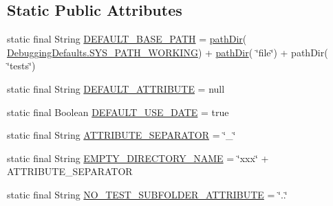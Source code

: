 \subsection*{Static Public Attributes}
\begin{DoxyCompactItemize}
\item 
static final String \hyperlink{classit_1_1emarolab_1_1cagg_1_1interfaces_1_1CaggGrammarTesterOnFile_a2ab3d8af62c461ca52a0d174d6e0ed42}{D\-E\-F\-A\-U\-L\-T\-\_\-\-B\-A\-S\-E\-\_\-\-P\-A\-T\-H} = \hyperlink{classit_1_1emarolab_1_1cagg_1_1interfaces_1_1CaggGrammarTesterOnFile_aa398e2cc3a5a0d558b20109c022fc037}{path\-Dir}( \hyperlink{classit_1_1emarolab_1_1cagg_1_1debugging_1_1DebuggingDefaults_ac2710a46c5c4c629928170fa5e90095d}{Debugging\-Defaults.\-S\-Y\-S\-\_\-\-P\-A\-T\-H\-\_\-\-W\-O\-R\-K\-I\-N\-G}) + \hyperlink{classit_1_1emarolab_1_1cagg_1_1interfaces_1_1CaggGrammarTesterOnFile_aa398e2cc3a5a0d558b20109c022fc037}{path\-Dir}( \char`\"{}file\char`\"{}) + path\-Dir( \char`\"{}tests\char`\"{})
\item 
static final String \hyperlink{classit_1_1emarolab_1_1cagg_1_1interfaces_1_1CaggGrammarTesterOnFile_a41558776eba9084504efe205570d86ba}{D\-E\-F\-A\-U\-L\-T\-\_\-\-A\-T\-T\-R\-I\-B\-U\-T\-E} = null
\item 
static final Boolean \hyperlink{classit_1_1emarolab_1_1cagg_1_1interfaces_1_1CaggGrammarTesterOnFile_a91c37e480e447587dd2562391b10ffb2}{D\-E\-F\-A\-U\-L\-T\-\_\-\-U\-S\-E\-\_\-\-D\-A\-T\-E} = true
\item 
static final String \hyperlink{classit_1_1emarolab_1_1cagg_1_1interfaces_1_1CaggGrammarTesterOnFile_a01dd67381230b209dee66ac505842a81}{A\-T\-T\-R\-I\-B\-U\-T\-E\-\_\-\-S\-E\-P\-A\-R\-A\-T\-O\-R} = \char`\"{}\-\_\-\char`\"{}
\item 
static final String \hyperlink{classit_1_1emarolab_1_1cagg_1_1interfaces_1_1CaggGrammarTesterOnFile_a6f6d6ac91cb69282b2fe915025ad2090}{E\-M\-P\-T\-Y\-\_\-\-D\-I\-R\-E\-C\-T\-O\-R\-Y\-\_\-\-N\-A\-M\-E} = \char`\"{}xxx\char`\"{} + A\-T\-T\-R\-I\-B\-U\-T\-E\-\_\-\-S\-E\-P\-A\-R\-A\-T\-O\-R
\item 
static final String \hyperlink{classit_1_1emarolab_1_1cagg_1_1interfaces_1_1CaggGrammarTesterOnFile_adda7ad6a98ec9c05d1b7e1043ef271da}{N\-O\-\_\-\-T\-E\-S\-T\-\_\-\-S\-U\-B\-F\-O\-L\-D\-E\-R\-\_\-\-A\-T\-T\-R\-I\-B\-U\-T\-E} = \char`\"{}..\char`\"{}
\end{DoxyCompactItemize}
